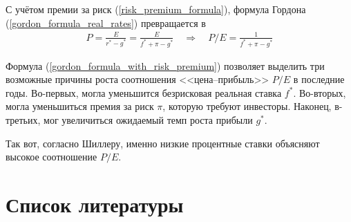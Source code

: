 С учётом премии за риск (\ref{risk_premium_formula}), формула Гордона (\ref{gordon_formula_real_rates}) превращается в 
\begin{align}
P =\frac{E}{r^* - g^*} = \frac{E}{f^* + \pi - g^*}
\quad
\Rightarrow
\quad
P/E = \frac{1}{f^* + \pi - g^*}
\label{gordon_formula_with_risk_premium}
\end{align}

Формула (\ref{gordon_formula_with_risk_premium}) позволяет выделить три возможные причины роста соотношения <<цена--прибыль>> $P/E$ в последние годы. Во-первых, могла уменьшится безрисковая реальная ставка $f^*$. Во-вторых, могла уменьшиться премия за риск $\pi$, которую требуют инвесторы. Наконец, в-третьих, мог увеличиться ожидаемый темп роста прибыли $g^*$.

Так вот, согласно Шиллеру, именно низкие процентные ставки объясняют высокое соотношение $P/E$.

\section*{Список литературы}
\en{
\printbibliography[heading = none]
}


